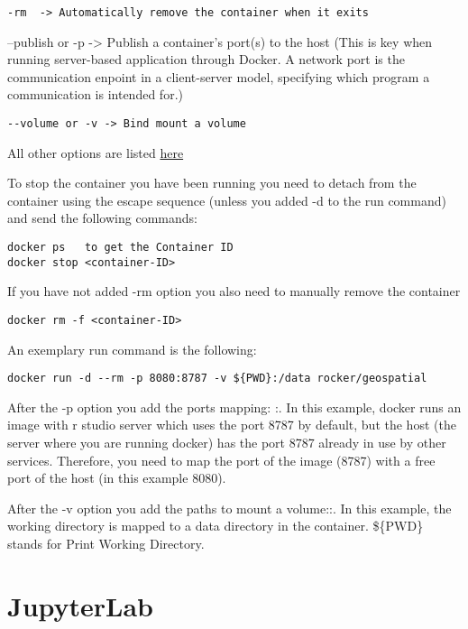 \documentclass[
]{book}
\begin{document}
\begin{verbatim}
-rm  -> Automatically remove the container when it exits
\end{verbatim}

--publish or -p -\textgreater{} Publish a container's port(s) to the host (This is key when running server-based application through Docker. A network port is the communication enpoint in a client-server model, specifying which program a communication is intended for.)

\begin{verbatim}
--volume or -v -> Bind mount a volume 
\end{verbatim}

All other options are listed \href{https://docs.docker.com/engine/reference/commandline/run/}{here}

To stop the container you have been running you need to detach from the container using the escape sequence (unless you added -d to the run command) and send the following commands:

\begin{verbatim}
docker ps   to get the Container ID
docker stop <container-ID>  
\end{verbatim}

If you have not added -rm option you also need to manually remove the container

\begin{verbatim}
docker rm -f <container-ID>
\end{verbatim}

An exemplary run command is the following:

\begin{verbatim}
docker run -d --rm -p 8080:8787 -v ${PWD}:/data rocker/geospatial
\end{verbatim}

After the -p option you add the ports mapping: :. In this example, docker runs an image with r studio server which uses the port 8787 by default, but the host (the server where you are running docker) has the port 8787 already in use by other services. Therefore, you need to map the port of the image (8787) with a free port of the host (in this example 8080).

After the -v option you add the paths to mount a volume::. In this example, the working directory is mapped to a data directory in the container. \$\{PWD\} stands for Print Working Directory.

\hypertarget{jupyterlab}{%
\chapter{JupyterLab}\label{jupyterlab}}
\end{document}
